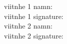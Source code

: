 \documentclass{letter}
\begin{document}

\vfill

viitnhe 1 namn:\hrulefill\\

viitnhe 1 signature:\hrulefill\\


viitnhe 2 namn:\hrulefill\\

viitnhe 2 signature:\hrulefill
\end{document}

